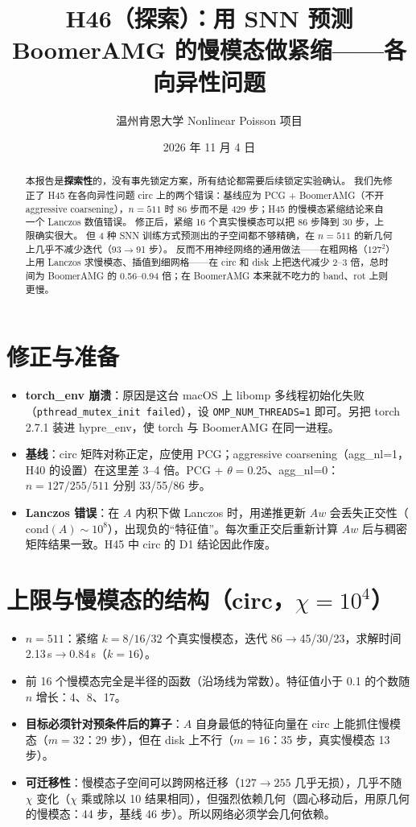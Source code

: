 \documentclass[11pt,a4paper]{ctexart}
\title{H46（探索）：用 SNN 预测 BoomerAMG 的慢模态做紧缩——各向异性问题}
\author{温州肯恩大学 \quad Nonlinear Poisson 项目}
\date{2026 年 11 月 4 日}
\begin{document}
\sloppy
\maketitle
\begin{abstract}
本报告是\textbf{探索性}的，没有事先锁定方案，所有结论都需要后续锁定实验确认。
我们先修正了 H45 在各向异性问题 circ 上的两个错误：基线应为 PCG + BoomerAMG（不开 aggressive coarsening），$n=511$ 时 86 步而不是 429 步；H45 的慢模态紧缩结论来自一个 Lanczos 数值错误。
修正后，紧缩 16 个真实慢模态可以把 86 步降到 30 步，上限确实很大。
但 4 种 SNN 训练方式预测出的子空间都不够精确，在 $n=511$ 的新几何上几乎不减少迭代（93$\to$91 步）。
反而不用神经网络的通用做法——在粗网格（$127^2$）上用 Lanczos 求慢模态、插值到细网格——在 circ 和 disk 上把迭代减少 2--3 倍，总时间为 BoomerAMG 的 0.56--0.94 倍；在 BoomerAMG 本来就不吃力的 band、rot 上则更慢。
\end{abstract}

\section{修正与准备}
\begin{itemize}
\item \textbf{torch\_env 崩溃}：原因是这台 macOS 上 libomp 多线程初始化失败（\texttt{pthread\_mutex\_init failed}），设 \texttt{OMP\_NUM\_THREADS=1} 即可。另把 torch 2.7.1 装进 hypre\_env，使 torch 与 BoomerAMG 在同一进程。
\item \textbf{基线}：circ 矩阵对称正定，应使用 PCG；aggressive coarsening（agg\_nl=1，H40 的设置）在这里差 3--4 倍。PCG + $\theta=0.25$、agg\_nl=0：$n=127/255/511$ 分别 33/55/86 步。
\item \textbf{Lanczos 错误}：在 $A$ 内积下做 Lanczos 时，用递推更新 $Aw$ 会丢失正交性（$\mathrm{cond}(A)\sim10^8$），出现负的“特征值”。每次重正交后重新计算 $Aw$ 后与稠密矩阵结果一致。H45 中 circ 的 D1 结论因此作废。
\end{itemize}

\section{上限与慢模态的结构（circ，$\chi=10^4$）}
\begin{itemize}
\item $n=511$：紧缩 $k=8/16/32$ 个真实慢模态，迭代 86$\to$45/30/23，求解时间 2.13\,s$\to$0.84\,s（$k=16$）。
\item 前 16 个慢模态完全是半径的函数（沿场线为常数）。特征值小于 0.1 的个数随 $n$ 增长：4、8、17。
\item \textbf{目标必须针对预条件后的算子}：$A$ 自身最低的特征向量在 circ 上能抓住慢模态（$m=32$：29 步），但在 disk 上不行（$m=16$：35 步，真实慢模态 13 步）。
\item \textbf{可迁移性}：慢模态子空间可以跨网格迁移（$127\to255$ 几乎无损），几乎不随 $\chi$ 变化（$\chi$ 乘或除以 10 结果相同），但强烈依赖几何（圆心移动后，用原几何的慢模态：44 步，基线 46 步）。所以网络必须学会几何依赖。
\end{itemize}
\end{document}
